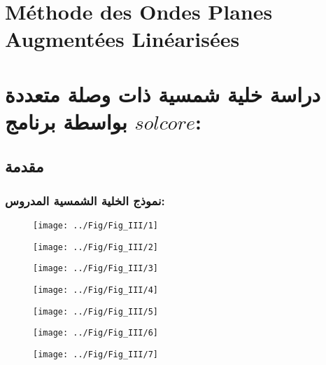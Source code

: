 \chapter{Méthode des Ondes Planes Augmentées Linéarisées } %

\label{Chapter3} %



\chapter{دراسة خلية شمسية ذات وصلة متعددة بواسطة برنامج $ solcore  $:}
\section{مقدمة}
\subsection{نموذج الخلية الشمسية المدروس:}




\begin{figure}[h!]
	\centering
	\texttt{[image: ../Fig/Fig\_III/1]}
	\caption{}
	\label{fig:1}
\end{figure}
\FloatBarrier

\begin{figure}[h!]
	\centering
	\texttt{[image: ../Fig/Fig\_III/2]}
	\caption{}
	\label{fig:2}
\end{figure}
\FloatBarrier

\begin{figure}[h!]
	\centering
	\texttt{[image: ../Fig/Fig\_III/3]}
	\caption{}
	\label{fig:3}
\end{figure}
\FloatBarrier

\begin{figure}[h!]
	\centering
	\texttt{[image: ../Fig/Fig\_III/4]}
	\caption{}
	\label{fig:4}
\end{figure}
\FloatBarrier

\begin{figure}[h!]
	\centering
	\texttt{[image: ../Fig/Fig\_III/5]}
	\caption{}
	\label{fig:5}
\end{figure}
\FloatBarrier

\begin{figure}[h!]
	\centering
	\texttt{[image: ../Fig/Fig\_III/6]}
	\caption{}
	\label{fig:6}
\end{figure}
\FloatBarrier

\begin{figure}[h!]
	\centering
	\texttt{[image: ../Fig/Fig\_III/7]}
	\caption{}
	\label{fig:7}
\end{figure}
\FloatBarrier